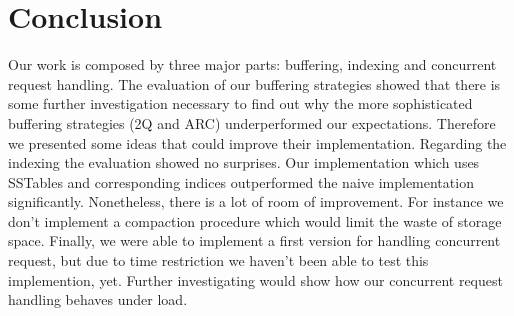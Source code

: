 \documentclass[a4paper, twocolumn,11pt]{article}
\begin{document}
\section{Conclusion}
Our work is composed by three major parts: buffering, indexing and concurrent request handling. The evaluation of our buffering strategies showed that there is some further investigation necessary to find out why the more sophisticated buffering strategies (2Q and ARC) underperformed our expectations. Therefore we presented some ideas that could improve their implementation. Regarding the indexing the evaluation showed no surprises. Our implementation which uses SSTables and corresponding indices outperformed the naive implementation significantly. Nonetheless, there is a lot of room of improvement. For instance we don't implement a compaction procedure which would limit the waste of storage space. Finally, we were able to implement a first version for handling concurrent request, but due to time restriction we haven't been able to test this implemention, yet. Further investigating would show how our concurrent request handling behaves under load. 
\printbibliography[heading=bibintoc]
\end{document}
